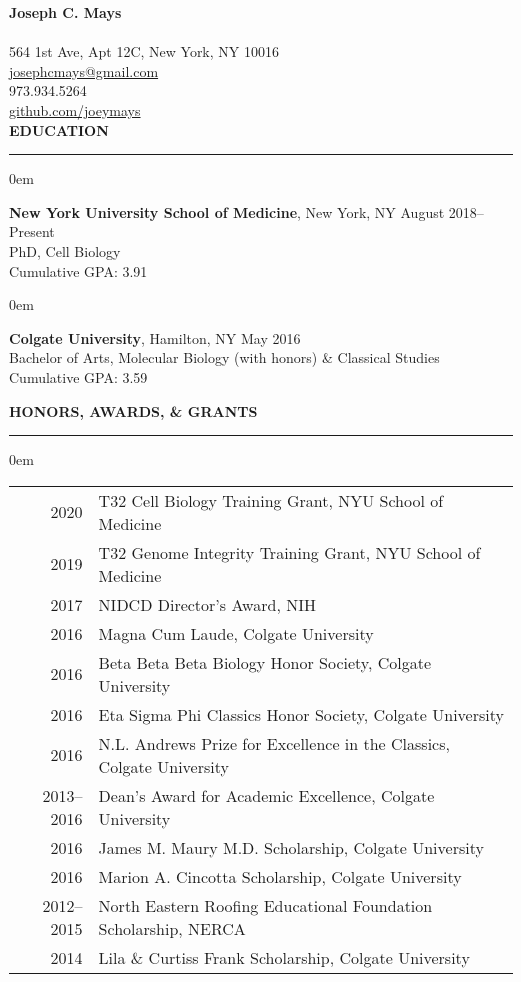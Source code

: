 \documentclass[11pt, letterpaper]{article}
\newenvironment{CVSection}{
\begin{addmargin}[2em]{0em}
\begin{samepage}}
{\end{samepage}
\end{addmargin}\bigskip}
\newcommand{\CVHeading}[1]{
\MakeUppercase{\bf #1}
\smallskip
\hrule
\medskip
}
\begin{document}
{\Huge\textbf{Joseph C. Mays}}\\\\
\faHome\hspace{2 mm}564 1st Ave, Apt 12C, New York, NY 10016\\
\faEnvelopeSquare\hspace{2.3 mm}\href{mailto:josephcmays+CV@gmail.com}{josephcmays@gmail.com}\\
\faPhone\hspace{2.4 mm}973.934.5264\\
\faGithub\hspace{2 mm}\href{https://github.com/joeymays}{github.com/joeymays}\\

\CVHeading{Education}
\begin{CVSection}
\textbf{New York University School of Medicine}, New York, NY \hfill August 2018--Present\\
PhD, Cell Biology\\
Cumulative GPA: 3.91
\end{CVSection}

\begin{CVSection}
\textbf{Colgate University}, Hamilton, NY \hfill May 2016\\
Bachelor of Arts, Molecular Biology (with honors) \& Classical Studies\\ 
Cumulative GPA: 3.59
\end{CVSection}

\CVHeading{Honors, Awards, \& Grants}
\begin{CVSection}
\begin{tabular}{r|l}
2020 & T32 Cell Biology Training Grant, NYU School of Medicine\\
2019 & T32 Genome Integrity Training Grant, NYU School of Medicine\\
2017 & NIDCD Director’s Award, NIH\\
2016 & Magna Cum Laude, Colgate University\\
2016 & Beta Beta Beta Biology Honor Society, Colgate University\\
2016 & Eta Sigma Phi Classics Honor Society, Colgate University\\
2016 & N.L. Andrews Prize for Excellence in the Classics, Colgate University\\
2013--2016 & Dean’s Award for Academic Excellence, Colgate University\\
2016 & James M. Maury M.D. Scholarship, Colgate University\\
2016 & Marion A. Cincotta Scholarship, Colgate University\\
2012--2015 & North Eastern Roofing Educational Foundation Scholarship, NERCA\\
2014 & Lila \& Curtiss Frank Scholarship, Colgate University
\end{tabular}
\end{CVSection}
\end{document}
